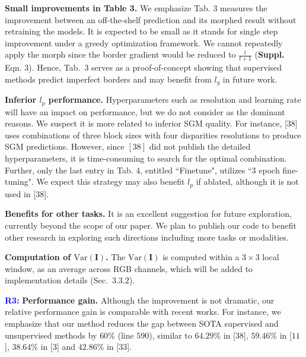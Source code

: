 \documentclass[10pt,twocolumn,letterpaper]{article}
\newcommand{\Paragraph}[1]{\vspace{0.40mm} \noindent \textbf{#1} \hspace{0mm}}
\begin{document}
\Paragraph{Small improvements in Table 3.} 
We emphasize Tab. $3$ measures the improvement between an off-the-shelf prediction and its morphed result without retraining the models. 
It is expected to be small as it stands for single step improvement under a greedy optimization framework. 
We cannot repeatedly apply the morph since the border gradient would be reduced to $\frac{t}{t+1}$ (\textbf{Suppl.} Eqn. $3$).
Hence, Tab.~$3$ serves as a proof-of-concept showing that supervised methods predict imperfect borders and may benefit from $l_g$ in future work. 

\Paragraph{Inferior ${l_p}$ performance.} 
Hyperparameters such as resolution and learning rate will have an impact on performance, but we do not consider as the dominant reasons. 
We suspect it is more related to inferior SGM quality. 
For instance, [$38$] uses combinations of three block sizes with four disparities resolutions to produce SGM predictions. 
However, since $[38]$ did not publish the detailed hyperparameters, it is time-consuming to search for the optimal combination. 
Further, only the last entry in Tab. $4$, entitled ``Finetune", utilizes ``$3$ epoch fine-tuning". 
We expect this strategy may also benefit $l_p$ if ablated, although it is not used in [$38$]. %

\Paragraph{Benefits for other tasks.} 
It is an excellent suggestion for future exploration, currently beyond the scope of our paper. 
We plan to publish our code to benefit other research in exploring such directions including more tasks or modalities.

\Paragraph{Computation of $\text{Var}(\mathbf{I})$. } 
The $\text{Var}(\mathbf{I})$ is computed within a $3 \times 3$ local window, as an average across RGB channels, which will be added to implementation details (Sec.~$3.3.2$).

\Paragraph{\textcolor{blue}{R3:}}
\Paragraph{Performance gain.} 
Although the improvement is not dramatic, our relative performance gain is comparable with recent works.
For instance, we emphasize that our method reduces the gap between SOTA supervised and unsupervised methods by $60\%$ (line $590$), similar to $64.29\%$ in [$38$], $59.46\%$ in [$11$], $38.64\%$ in [$3$] and $42.86\%$ in [$33$]. 
\end{document}
